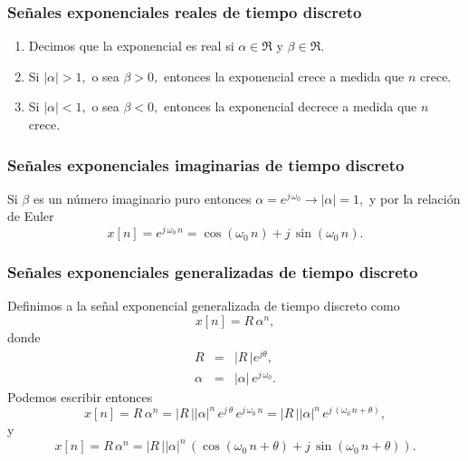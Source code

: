 \subsubsection{Se\~{n}ales exponenciales reales de tiempo discreto}

\begin{enumerate}
\item Decimos que la exponencial es real si 
$\alpha \in \Re$ y $\beta \in \Re$.

\item Si $\left| \alpha \right| >1,$ o sea $\beta >0,$ entonces la
  exponencial crece a medida que $n$ crece.

\item Si $\left| \alpha \right| <1,$ o sea $\beta <0,$ entonces la
  exponencial decrece a medida que $n$ crece.
\end{enumerate}

\subsubsection{Se\~{n}ales exponenciales imaginarias de tiempo discreto}

Si $\beta $ es un n\'{u}mero imaginario puro entonces 
$\alpha = e^{j \, \omega_{0}} \rightarrow \left| \alpha \right| =1,$ y por la relaci\'{o}n de Euler
\begin{equation}
  x\left[ n\right] = 
  e^{j \, \omega_{0} \, n}=
  \cos \left( \omega_{0} \, n\right) +j \, \sin\left( \omega_{0} \, n\right).
\end{equation}

\subsubsection{Se\~{n}ales exponenciales generalizadas de tiempo discreto}

Definimos a la se\~{n}al exponencial generalizada de tiempo discreto
como
\begin{equation}
  x\left[ n\right] = R \, \alpha^{n},
\end{equation}
donde
\begin{eqnarray}
  R &=&\left| R \, \right| e^{j\theta }, \\
  \alpha &=&\left| \alpha \right| \, e^{j \, \omega_{0}}.
\end{eqnarray}
Podemos escribir entonces
\begin{equation}
  x\left[ n\right] =R \, \alpha^{n}=
  \left| R \, \right| \left| \alpha \right|^{n} \, e^{j \, \theta } \, e^{j \, \omega_{0} \, n} = 
  \left| R \, \right| \left| \alpha \right|^{n} \, e^{j \, (\omega_{0} \, n + \theta)},
\end{equation}
y
\begin{equation}
  x\left[ n\right] =R \, \alpha^{n}=
  \left| R \, \right| \left| \alpha \right|^{n} \, 
  \left( \cos \left( \omega_{0} \, n+\theta \right) +j \, \sin\left(\omega_{0} \, n+\theta \right) \right) .
\end{equation}

